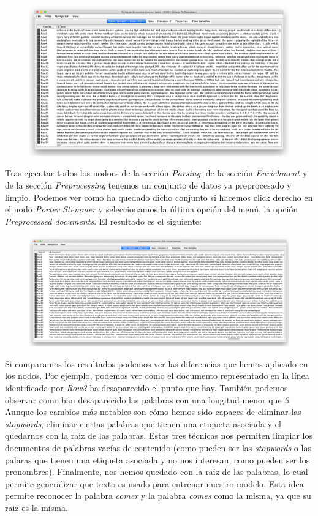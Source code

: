 \documentclass[11pt]{article}
\begin{document}
\begin{figure}[H]
	\centering
	\includegraphics[width=0.9\linewidth]{images/raw.png}
\end{figure}

Tras ejecutar todos los nodoes de la sección \textit{Parsing}, de la sección \textit{Enrichment} y de la sección \textit{Preprocessing} tenemos un conjunto de datos ya preprocesado y limpio. Podemos ver como ha quedado dicho conjunto si hacemos click derecho en el nodo \textit{Porter Stemmer} y seleccionamos la última opción del menú, la opción \textit{Preprocessed documents}. El resultado es el siguiente:

\begin{figure}[H]
	\centering
	\includegraphics[width=0.9\linewidth]{images/preprocessed.png}
\end{figure}

Si comparamos los resultados podemos ver las diferencias que hemos aplicado en los nodos. Por ejemplo, podemos ver como el documento representado en la línea identificada por \textit{Row3} ha desaparecido el punto que hay. También podemos observar como han desaparecido las palabras con una longitud menor que \textit{3}. Aunque los cambios más notables son cómo hemos sido capaces de eliminar las \textit{stopwords}, eliminar ciertas palabras que tienen una etiqueta asociada y el quedarnos con la raiz de las palabras. Estas tres técnicas nos permiten limpiar los documentos de palabras vacías de contenido (como pueden ser las \textit{stopwords} o las palaras que tienen una etiqueta asociada y no nos interesan, como pueden ser los pronombres). Finalmente, nos hemos quedado con la raiz de las palabras, lo cual permite generalizar que texto es usado para entrenar nuestro modelo. Esta idea permite reconocer la palabra \textit{comer} y la palabra \textit{comes} como la misma, ya que su raiz es la misma. \\
\end{document}
